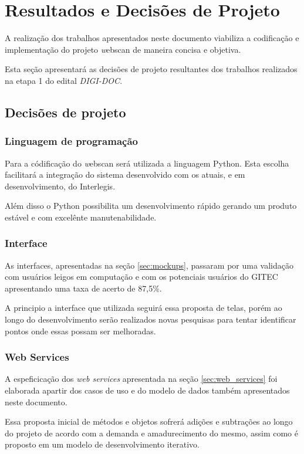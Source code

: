 \section{Resultados e Decisões de Projeto}
\label{sec:resultados}

A realização dos trabalhos apresentados neste documento viabiliza a
codificação e implementação do projeto {\emph webscan} de maneira
concisa e objetiva.

Esta seção apresentará as decisões de projeto resultantes dos trabalhos
realizados na etapa 1 do edital \emph{DIGI-DOC}.

\subsection{Decisões de projeto}

\subsubsection{Linguagem de programação}
Para a códificação do {\emph webscan} será utilizada a linguagem Python.
Esta escolha facilitará a integração do sistema desenvolvido com os atuais,
e em desenvolvimento, do Interlegis.

Além disso o Python possibilita um desenvolvimento rápido gerando
um produto estável e com excelênte manutenabilidade. 

\subsubsection{Interface}
As interfaces, apresentadas na seção \ref{sec:mockups}, passaram por uma
validação com usuários leigos em computação e com os potenciais usuários
do GITEC apresentando uma taxa de acerto de 87,5\%.

A principio a interface que utilizada seguirá essa proposta de telas,
porém ao longo do desenvolvimento serão realizados novas pesquisas para
tentar identificar pontos onde essas possam ser melhoradas. 

\subsubsection{Web Services}
A espeficicação dos \emph{web services} apresentada na 
seção \ref{sec:web_services} foi elaborada apartir dos casos de uso
e do modelo de dados também apresentados neste documento.

Essa proposta inicial de métodos e objetos sofrerá adições e subtrações 
ao longo do projeto de acordo com a demanda e amadurecimento do mesmo,
assim como é proposto em um modelo de desenvolvimento iterativo.

